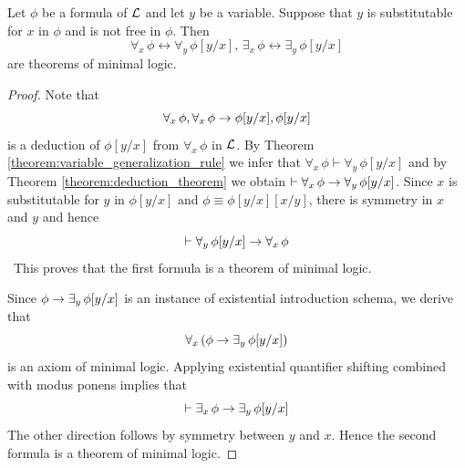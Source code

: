 \documentclass[10pt]{amsart}
\begin{document}
\begin{proposition}\label{proposition:alpha_equivalence}
  Let $\phi$ be a formula of ${\mathcal L}$ and let $y$ be a variable. Suppose that $y$ is substitutable for $x$ in $\phi$ and is not free in $\phi$. Then
  $$\forall_x\,\phi \leftrightarrow \forall_y\,\phi[y/x],\,\exists_x\,\phi \leftrightarrow \exists_y\,\phi[y/x]$$
  are theorems of minimal logic.
\end{proposition}
\begin{proof}
  Note that
  $$\forall_x\,\phi, \forall_x\,\phi \rightarrow \phi[y/x], \phi[y/x]$$
  is a deduction of $\phi[y/x]$ from $\forall_x\,\phi$ in ${\mathcal L}$. By Theorem \ref{theorem:variable_generalization_rule} we infer that $\forall_x\,\phi \vdash \forall_y\,\phi[y/x]$ and by Theorem \ref{theorem:deduction_theorem} we obtain $\vdash \forall_x\,\phi \rightarrow \forall_y\,\phi[y/x]$. Since $x$ is substitutable for $y$ in $\phi[y/x]$ and $\phi \equiv \phi[y/x][x/y]$, there is symmetry in $x$ and $y$ and hence 
  $$\vdash \forall_y\,\phi[y/x] \rightarrow \forall_x\,\phi$$\
  This proves that the first formula is a theorem of minimal logic.

  Since $\phi \rightarrow \exists_y\,\phi[y/x]$ is an instance of existential introduction schema, we derive that 
  $$\forall_x\left(\phi \rightarrow \exists_y\,\phi[y/x]\right)$$
  is an axiom of minimal logic. Applying existential quantifier shifting combined with modus ponens implies that 
  $$\vdash \exists_x\,\phi \rightarrow \exists_y\,\phi[y/x]$$
  The other direction follows by symmetry between $y$ and $x$. Hence the second formula is a theorem of minimal logic.
\end{proof}
\end{document}
